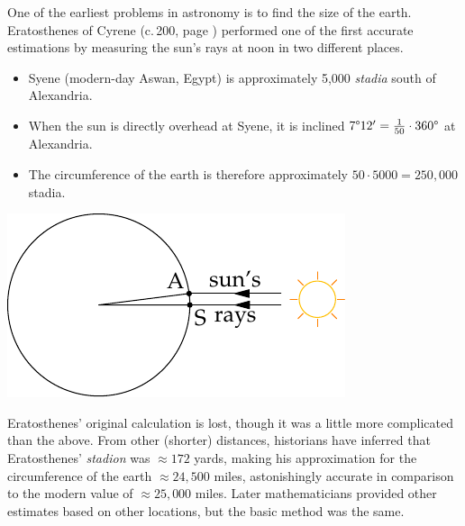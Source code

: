 \goodbreak


\label{pg:syene}

One of the earliest problems in astronomy is to find the size of the earth. Eratosthenes of Cyrene (c.\,200\BC, page \pageref{pg:eratosthenes}) performed one of the first accurate estimations by measuring the sun's rays at noon in two different places.\par
\begin{minipage}[t]{0.6\linewidth}\vspace{0pt}
	\begin{itemize}\itemsep0pt
	  \item Syene (modern-day Aswan, Egypt) is approximately 5,000 \emph{stadia} south of Alexandria.
		\item When the sun is directly overhead at Syene, it is inclined $\ang 712'=\frac 1{50}\cdot \ang{360}$ at Alexandria.
		\item The circumference of the earth is therefore approximately $50\cdot 5000=250,000$ stadia.
	\end{itemize}
\end{minipage}
\hfill
\begin{minipage}[t]{0.39\linewidth}\vspace{-5pt}
	\flushright\includegraphics[scale=0.95]{geo-18-circearth}
\end{minipage}
\bigbreak

Eratosthenes' original calculation is lost, though it was a little more complicated than the above. From other (shorter) distances, historians have inferred that Eratosthenes' \emph{stadion} was $\approx 172$ yards, making his approximation for the circumference of the earth $\approx 24,500$ miles, astonishingly accurate in comparison to the modern value of $\approx 25,000$ miles. Later mathematicians provided other estimates based on other locations, but the basic method was the same.



